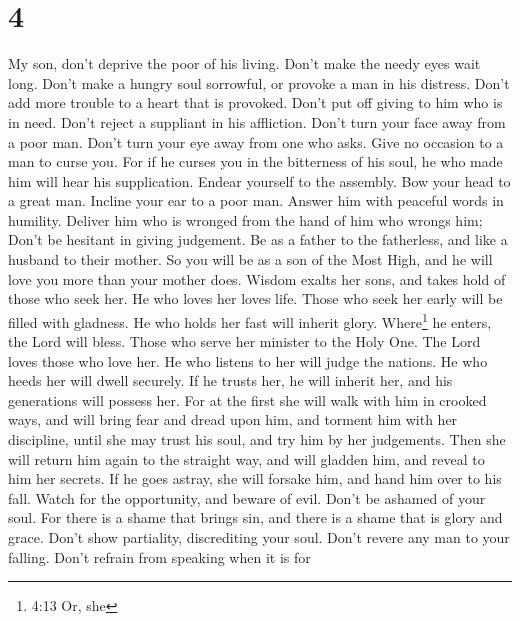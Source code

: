 \hypertarget{section-2}{%
\section{4}\label{section-2}}

 My son, don't deprive the poor of his living. Don't make
the needy eyes wait long.  Don't make a hungry soul
sorrowful, or provoke a man in his distress.  Don't add more
trouble to a heart that is provoked. Don't put off giving to him who is
in need.  Don't reject a suppliant in his affliction. Don't
turn your face away from a poor man.  Don't turn your eye
away from one who asks. Give no occasion to a man to curse you.
 For if he curses you in the bitterness of his soul, he who
made him will hear his supplication.  Endear yourself to the
assembly. Bow your head to a great man.  Incline your ear to
a poor man. Answer him with peaceful words in humility. 
Deliver him who is wronged from the hand of him who wrongs him; Don't be
hesitant in giving judgement.  Be as a father to the
fatherless, and like a husband to their mother. So you will be as a son
of the Most High, and he will love you more than your mother does.
 Wisdom exalts her sons, and takes hold of those who seek
her.  He who loves her loves life. Those who seek her early
will be filled with gladness.  He who holds her fast will
inherit glory. Where\footnote{4:13 Or, she} he enters, the Lord will
bless.  Those who serve her minister to the Holy One. The
Lord loves those who love her.  He who listens to her will
judge the nations. He who heeds her will dwell securely. 
If he trusts her, he will inherit her, and his generations will possess
her.  For at the first she will walk with him in crooked
ways, and will bring fear and dread upon him, and torment him with her
discipline, until she may trust his soul, and try him by her judgements.
 Then she will return him again to the straight way, and
will gladden him, and reveal to him her secrets.  If he
goes astray, she will forsake him, and hand him over to his fall.
 Watch for the opportunity, and beware of evil. Don't be
ashamed of your soul.  For there is a shame that brings
sin, and there is a shame that is glory and grace.  Don't
show partiality, discrediting your soul. Don't revere any man to your
falling.  Don't refrain from speaking when it is for
